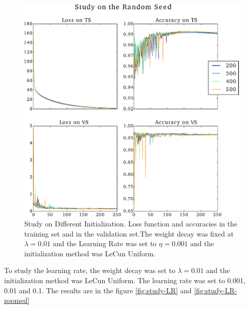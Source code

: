 \documentclass{article}
\begin{document}
\begin{figure}[H]
	\centering
	\includegraphics[width=\linewidth]{study_on_random_seed_v2.pdf}
	\caption{Study on Different Initialization. Loss function and accuracies in the training set and in the validation set.The weight decay was fixed at $\lambda = 0.01$ and the Learning Rate was set to $\eta = 0.001$ and the initialization method was LeCun Uniform.
}
\label{fig:study-seeds}
\end{figure}


To study the learning rate, the weight decay was set to $\lambda = 0.01$ and the initialization method was LeCun Uniform. The learning rate was set to 0.001, 0.01 and 0.1. The results are in the figure \ref{fig:study-LR} and \ref{fig:study-LR-zoomed}
\end{document}
